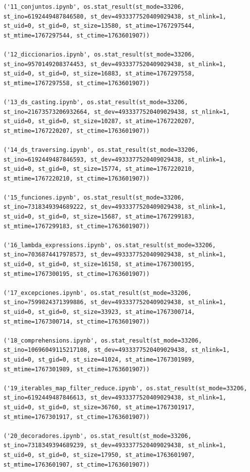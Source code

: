 \documentclass[
  spanish,
  letterpaper,
]{scrbook}
\theoremstyle{definition}
\theoremstyle{remark}
\begin{document}
\begin{verbatim}
('11_conjuntos.ipynb', os.stat_result(st_mode=33206, st_ino=6192449487846580, st_dev=4933377520409029438, st_nlink=1, st_uid=0, st_gid=0, st_size=13580, st_atime=1767297544, st_mtime=1767297544, st_ctime=1763601907))

('12_diccionarios.ipynb', os.stat_result(st_mode=33206, st_ino=9570149208374453, st_dev=4933377520409029438, st_nlink=1, st_uid=0, st_gid=0, st_size=16883, st_atime=1767297558, st_mtime=1767297558, st_ctime=1763601907))

('13_ds_casting.ipynb', os.stat_result(st_mode=33206, st_ino=21673573206932664, st_dev=4933377520409029438, st_nlink=1, st_uid=0, st_gid=0, st_size=10287, st_atime=1767220207, st_mtime=1767220207, st_ctime=1763601907))

('14_ds_traversing.ipynb', os.stat_result(st_mode=33206, st_ino=6192449487846593, st_dev=4933377520409029438, st_nlink=1, st_uid=0, st_gid=0, st_size=15774, st_atime=1767220210, st_mtime=1767220210, st_ctime=1763601907))

('15_funciones.ipynb', os.stat_result(st_mode=33206, st_ino=7318349394689222, st_dev=4933377520409029438, st_nlink=1, st_uid=0, st_gid=0, st_size=15687, st_atime=1767299183, st_mtime=1767299183, st_ctime=1763601907))

('16_lambda_expressions.ipynb', os.stat_result(st_mode=33206, st_ino=7036874417978573, st_dev=4933377520409029438, st_nlink=1, st_uid=0, st_gid=0, st_size=16158, st_atime=1767300195, st_mtime=1767300195, st_ctime=1763601907))

('17_excepciones.ipynb', os.stat_result(st_mode=33206, st_ino=7599824371399886, st_dev=4933377520409029438, st_nlink=1, st_uid=0, st_gid=0, st_size=33923, st_atime=1767300714, st_mtime=1767300714, st_ctime=1763601907))

('18_comprehensions.ipynb', os.stat_result(st_mode=33206, st_ino=10696049115217108, st_dev=4933377520409029438, st_nlink=1, st_uid=0, st_gid=0, st_size=41024, st_atime=1767301989, st_mtime=1767301989, st_ctime=1763601907))

('19_iterables_map_filter_reduce.ipynb', os.stat_result(st_mode=33206, st_ino=6192449487846613, st_dev=4933377520409029438, st_nlink=1, st_uid=0, st_gid=0, st_size=36760, st_atime=1767301917, st_mtime=1767301917, st_ctime=1763601907))

('20_decoradores.ipynb', os.stat_result(st_mode=33206, st_ino=7318349394689239, st_dev=4933377520409029438, st_nlink=1, st_uid=0, st_gid=0, st_size=17950, st_atime=1763601907, st_mtime=1763601907, st_ctime=1763601907))


\end{verbatim}
\end{document}
